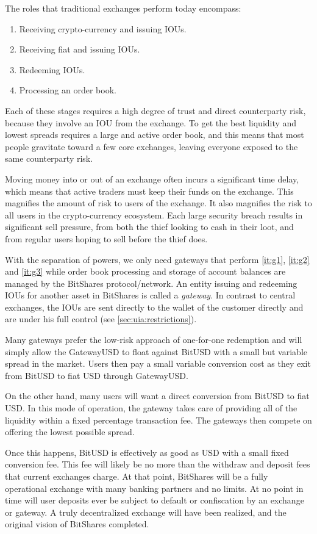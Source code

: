\label{sec:gateway}

The roles that traditional exchanges perform today encompass:

\begin{enumerate}
 \item \label{it:g1} Receiving crypto-currency and issuing IOUs.
 \item \label{it:g2} Receiving fiat and issuing IOUs.
 \item \label{it:g3} Redeeming IOUs.
 \item \label{it:g4} Processing an order book.
\end{enumerate}

Each of these stages requires a high degree of trust and direct counterparty
risk, because they involve an IOU from the exchange. To get the best
liquidity and lowest spreads requires a large and active order book, and this
means that most people gravitate toward a few core exchanges, leaving everyone
exposed to the same counterparty risk.

Moving money into or out of an exchange often incurs a significant time delay,
which means that active traders must keep their funds on the exchange. This
magnifies the amount of risk to users of the exchange. It also magnifies the
risk to all users in the crypto-currency ecosystem. Each large security breach
results in significant sell pressure, from both the thief looking to cash in
their loot, and from regular users hoping to sell before the thief does.

\medskip

With the separation of powers, we only need gateways that perform \cref{it:g1},
\cref{it:g2} and \cref{it:g3} while order book processing and storage of
account balances are managed by the BitShares protocol/network. An entity
issuing and redeeming IOUs for another asset in BitShares is called a
\emph{gateway}. In contrast to central exchanges, the IOUs are sent directly to
the wallet of the customer directly and are under his full control (see
\cref{sec:uia:restrictions}).

Many gateways prefer the low-risk approach of one-for-one redemption and will
simply allow the GatewayUSD to float against BitUSD with a small but variable
spread in the market. Users then pay a small variable conversion cost as they
exit from BitUSD to fiat USD through GatewayUSD.

On the other hand, many users will want a direct conversion from BitUSD to fiat
USD. In this mode of operation, the gateway takes care of providing all of the
liquidity within a fixed percentage transaction fee. The gateways then
compete on offering the lowest possible spread.

Once this happens, BitUSD is effectively as good as USD with a small fixed
conversion fee. This fee will likely be no more than the withdraw and deposit
fees that current exchanges charge. At that point, BitShares will be a fully
operational exchange with many banking partners and no limits. At no point in
time will user deposits ever be subject to default or confiscation by an
exchange or gateway. A truly decentralized exchange will have been realized,
and the original vision of BitShares completed.

